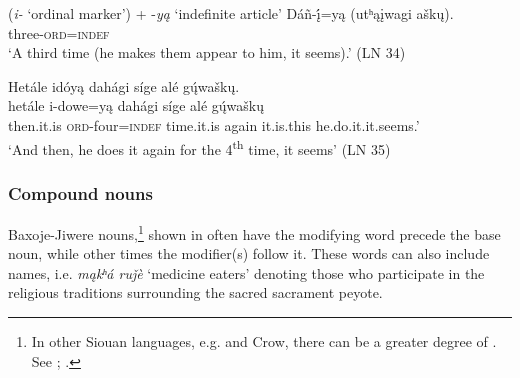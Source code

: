 \documentclass[output=paper]{LSP/langsci}
\begin{document}
 (\textit{i-} `ordinal marker') + -\textit{y\k{a}}  {\upshape `indefinite article' \citep[``The Wanderer'']{Marsh1936}}
\ea 
\gll Dáñ-\k{í}=y\k{a}     (utʰ\k{a}\k{i}wagi  a\v{s}k\k{u}).   \\
	three-\textsc{ord}=\textsc{indef} {} {} \\
\trans `A third time (he makes them appear to him, it seems).'	 (LN 34)  
		 
\ex 
\glll Hetále    idóy\k{a} dahági   síge   alé   g\k{ú}wa\v{s}k\k{u}. \\
hetále i-dowe=y\k{a}  dahági síge   alé   g\k{ú}wa\v{s}k\k{u} \\		   
then.it.is \textsc{ord}-four=\textsc{indef} time.it.is  again it.is.this he.do.it.it.seems.' \\ 
\trans `And then, he does it again for the 4\textsuperscript{th} time, it seems' (LN 35)
\z

\subsubsection{Compound nouns} 
Baxoje-Jiwere  nouns,\footnote{In other Siouan languages, e.g.  and Crow, there can be a greater degree of . See \citet[738]{Ullrich2008}; \citet{DeReuse1994,Graczyk1991a}.} shown in  often have the modifying word precede the base noun, while other times the modifier(s) follow it. These words can also include names, i.e. \textit{m\k{a}kʰá  ru\v{j}\`e} `medicine eaters' denoting those who participate in the religious traditions surrounding the sacred sacrament peyote.  
\end{document}
